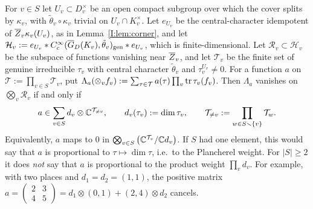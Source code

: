 \begin{lemma}\label{I:lem:cancel}
For $v\in S$ let $U_v\subset D_v^\times$ be an open compact subgroup over which the cover splits by $\kappa_v$, with $\tilde\theta_v\circ\kappa_v$ trivial on $U_v\cap K_v^\times$. Let $e_{U_v}$ be the central-character idempotent of $\overline{Z}_v\kappa_v(U_v)$, as in Lemma~\ref{I:lem:corner}, and let $\mathcal H_v:=e_{U_v}*C_c^\infty(\overline{G}_D(K_v),\tilde\theta_v)_{\mathrm{gen}}*e_{U_v}$, which is finite-dimensional. Let $\mathcal R_v\subset\mathcal H_v$ be the subspace of functions vanishing near $\overline{Z}_v$, and let $\mathcal T_v$ be the finite set of genuine irreducible $\tau_v$ with central character $\tilde\theta_v$ and $\tau_v^{U_v}\ne0$. For a function $a$ on $\mathcal T:=\prod_{v\in S}\mathcal T_v$, put $\Lambda_a(\otimes_vf_v):=\sum_{\tau\in\mathcal T}a(\tau)\prod_v\operatorname{tr}\tau_v(f_v)$. Then $\Lambda_a$ vanishes on $\bigotimes_v\mathcal R_v$ if and only if
\[ a\in\sum_{v\in S}d_v\otimes\mathbb{C}^{\mathcal T_{\ne v}},\qquad d_v(\tau_v):=\dim\tau_v,\qquad \mathcal T_{\ne v}:=\prod_{w\in S\smallsetminus\{v\}}\mathcal T_w. \]
Equivalently, $a$ maps to $0$ in $\bigotimes_{v\in S}\big(\mathbb{C}^{\mathcal T_v}/\mathbb{C} d_v\big)$. If $S$ had one element, this would say that $a$ is proportional to $\tau\mapsto\dim\tau$, i.e.\ to the Plancherel weight. For $|S|\ge2$ it does \emph{not} say that $a$ is proportional to the product weight $\prod_vd_v$. For example, with two places and $d_1=d_2=(1,1)$, the positive matrix $a=\left(\begin{smallmatrix}2&3\\4&5\end{smallmatrix}\right)=d_1\otimes(0,1)+(2,4)\otimes d_2$ cancels.
\end{lemma}

